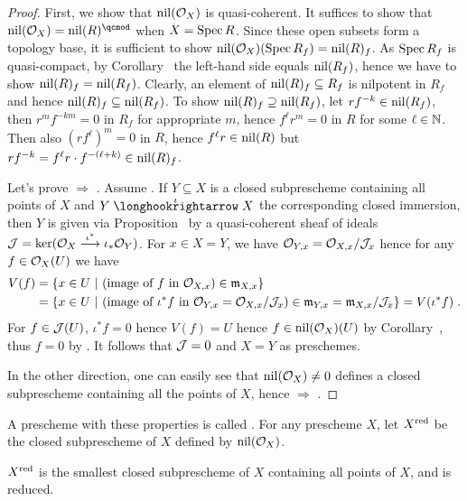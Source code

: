 \documentclass[a4paper,parskip=half,numbers=enddot, DIV=12]{scrreprt}
\begin{document}
\begin{proof}
    First, we show that $\operatorname{nil}(\mathcal{O}_X)$ is quasi-coherent. It suffices to show that $\nil(\Oo_X) = \nil(R)^\qcmod$ when $X=\operatorname{Spec} R$. Since these open subsets form a topology base, it is sufficient to show $\operatorname{nil}(\mathcal{O}_X)(\operatorname{Spec} R_f) = \operatorname{nil}(R)_f$. As $\operatorname{Spec} R_f$ is quasi-compact, by Corollary~ the left-hand side equals $\operatorname{nil}(R_f)$, hence we have to show $\operatorname{nil}(R)_f = \operatorname{nil}(R_f)$. Clearly, an element of $\operatorname{nil}(R)_f\subseteq R_f$ is nilpotent in $R_f$ and hence $\operatorname{nil}(R)_f\subseteq\operatorname{nil}(R_f)$. To show $\operatorname{nil}(R)_f\supseteq\operatorname{nil}(R_f)$, let $rf^{-k}\in \operatorname{nil}(R_f)$, then $r^mf^{-km} = 0$ in $R_f$ for appropriate $m$, hence $f^\ell r^m = 0$ in $R$ for some $\ell\in\mathbb{N}$. Then also $(rf^\ell)^m = 0$ in $R$, hence $f^\ell r\in \operatorname{nil}(R)$ but $rf^{-k}=f^\ell r\cdot f^{-(\ell+k)}\in \operatorname{nil}(R)_f$.
    
    Let's prove  $\Rightarrow$ . Assume . If $Y\subseteq X$ is a closed subprescheme containing all points of $X$ and $Y\monomorphism[\iota]X$ the corresponding closed immersion, then $Y$ is given via Proposition~ by a quasi-coherent sheaf of ideals $\Jj=\ker(\Oo_X\morphism[\iota^*]\iota_*\Oo_Y)$. For $x\in X=Y$, we have $\mathcal{O}_{Y,x}= \mathcal{O}_{X,x}/\mathcal{J}_x$ hence for any $f\in \mathcal{O}_X(U)$ we have
    \begin{align*}
    	V(f) &= \left\{x\in U\ \middle|\  (\text{image of }f\text{ in }\mathcal{O}_{X,x})\in\mathfrak{m}_{X,x}\right\}\\
    	&= \left\{x\in U\ \middle|\  (\text{image of }\iota^*f\text{ in }\mathcal{O}_{Y,x}=\mathcal{O}_{X,x}/\mathcal{J}_x)\in\mathfrak{m}_{Y,x}=\mathfrak{m}_{X,x}/\mathcal{J}_x\right\}=V(\iota^*f)\;.
    \end{align*}
     For $f\in \mathcal{J}(U)$, $\iota^*f = 0$ hence $V(f) = U$ hence $f\in \operatorname{nil}(\mathcal{O}_X)(U)$ by Corollary~, thus $f=0$ by . It follows that $\mathcal{J}=0$ and $X=Y$ as preschemes.
    
    In the other direction, one can easily see that $\operatorname{nil}(\mathcal{O}_X) \neq 0$ defines a closed subprescheme containing all the points of $X$, hence  $\Rightarrow$ .
\end{proof}
\begin{defi} 
    A prescheme with these properties is called . For any prescheme $X$, let $X^{\mathrm{red}}$ be the closed subprescheme of $X$ defined by $\operatorname{nil}(\mathcal{O}_X)$.
\end{defi}
\begin{rem}
    $X^{\mathrm{red}}$ is the smallest closed subprescheme of $X$ containing all points of $X$, and is reduced.
\end{rem}
\end{document}
